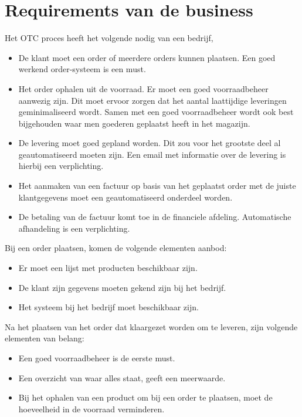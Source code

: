\section{Requirements van de business}
Het OTC proces heeft het volgende nodig van een bedrijf, \textcite{Biedron2018}
\begin{itemize}
	\item De klant moet een order of meerdere orders kunnen plaatsen. Een goed werkend order-systeem is een must.
	\item Het order ophalen uit de voorraad. Er moet een goed voorraadbeheer aanwezig zijn. Dit moet ervoor zorgen dat het aantal laattijdige leveringen geminimaliseerd wordt. Samen met een goed voorraadbeheer wordt ook best bijgehouden waar men goederen geplaatst heeft in het magazijn.
	\item De levering moet goed gepland worden. Dit zou voor het grootste deel al geautomatiseerd moeten zijn. Een email met informatie over de levering is hierbij een verplichting. 
	\item Het aanmaken van een factuur op basis van het geplaatst order met de juiste klantgegevens moet een geautomatiseerd onderdeel worden. 
	\item De betaling van de factuur komt toe in de financiele afdeling. Automatische afhandeling is een verplichting.
\end{itemize}
Bij een order plaatsen, komen de volgende elementen aanbod:
\begin{itemize}
	\item Er moet een lijst met producten beschikbaar zijn.
	\item De klant zijn gegevens moeten gekend zijn bij het bedrijf.
	\item Het systeem bij het bedrijf moet beschikbaar zijn.
\end{itemize}
Na het plaatsen van het order dat klaargezet worden om te leveren, zijn volgende elementen van belang:
\begin{itemize}
	\item Een goed voorraadbeheer is de eerste must.
	\item Een overzicht van waar alles staat, geeft een meerwaarde.
	\item Bij het ophalen van een product om bij een order te plaatsen, moet de hoeveelheid in de voorraad verminderen.
\end{itemize}
